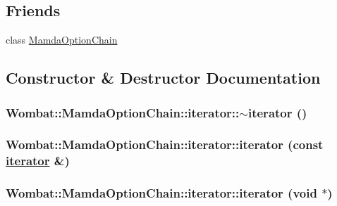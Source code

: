 \subsection*{Friends}
\begin{CompactItemize}
\item 
class \hyperlink{classWombat_1_1MamdaOptionChain_1_1iterator_f3175431d241ba2aa4df7e41301ee186}{Mamda\-Option\-Chain}
\end{CompactItemize}


\subsection{Constructor \& Destructor Documentation}
\hypertarget{classWombat_1_1MamdaOptionChain_1_1iterator_6680e6a1d4d4cec1f04aa091ee88741f}{
\subsubsection[$\sim$iterator]{\setlength{\rightskip}{0pt plus 5cm}Wombat::Mamda\-Option\-Chain::iterator::$\sim$iterator ()}}
\label{classWombat_1_1MamdaOptionChain_1_1iterator_6680e6a1d4d4cec1f04aa091ee88741f}


\hypertarget{classWombat_1_1MamdaOptionChain_1_1iterator_872f44b02dc42292997f39760ea017e8}{
\subsubsection[iterator]{\setlength{\rightskip}{0pt plus 5cm}Wombat::Mamda\-Option\-Chain::iterator::iterator (const \hyperlink{classWombat_1_1MamdaOptionChain_1_1iterator}{iterator} \&)}}
\label{classWombat_1_1MamdaOptionChain_1_1iterator_872f44b02dc42292997f39760ea017e8}


\hypertarget{classWombat_1_1MamdaOptionChain_1_1iterator_acb9b6f73ea9a47cc6b01d9b19b833b4}{
\subsubsection[iterator]{\setlength{\rightskip}{0pt plus 5cm}Wombat::Mamda\-Option\-Chain::iterator::iterator (void $\ast$)}}
\label{classWombat_1_1MamdaOptionChain_1_1iterator_acb9b6f73ea9a47cc6b01d9b19b833b4}




